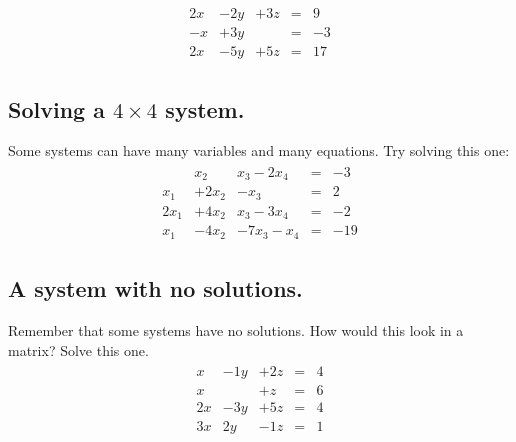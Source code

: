 \documentclass[12pt,fleqn]{book}
\begin{document}
\begin{align*}
	\begin{array}{rrrrr}
		2 x & - 2y & +3z & = & 9  \\
		- x & + 3y &     & = & -3 \\
		2 x & - 5y & +5z & = & 17
	\end{array}
\end{align*}
\clearpage
\subsection*{Solving a $4\times 4$ system.}
Some systems can have many variables and many equations.  Try solving this one:
\begin{align*}
	\begin{array}{rrrrrr}
		       & x_{2}    & x_{3}-2x_{4}    & = & -3  \\
		x_{1}  & + 2x_{2} & - x_{3}         & = & 2   \\
		2x_{1} & + 4x_{2} & x_{3}-3x_{4}    & = & -2  \\
		x_{1}  & - 4x_{2} & -7 x_{3}- x_{4} & = & -19
	\end{array}
\end{align*}
\clearpage
\subsection*{A system with no solutions.}
Remember that some systems have no solutions.  How would this look in a matrix? Solve this one.
\begin{align*}
	\begin{array}{rrrrr}
		x   & - 1y & +2z & = & 4 \\
		x   &      & +z  & = & 6 \\
		2 x & - 3y & +5z & = & 4 \\
		3 x & 2y   & -1z & = & 1
	\end{array}
\end{align*}
\clearpage
\end{document}
